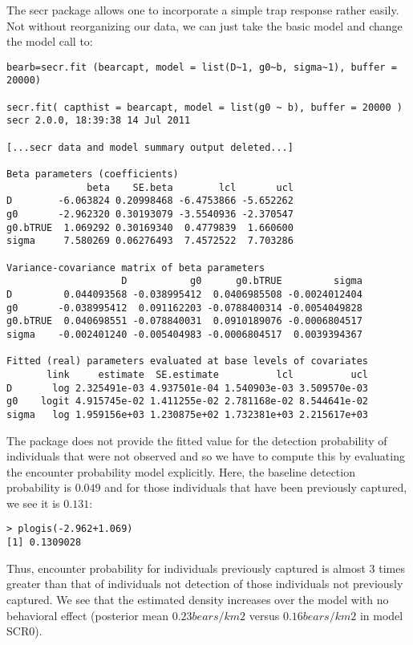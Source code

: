 The secr package allows one to incorporate a simple trap response
rather easily.  Not without reorganizing our data, we can just take
the basic model and change the model call to:
{\small
\begin{verbatim}
bearb=secr.fit (bearcapt, model = list(D~1, g0~b, sigma~1), buffer = 20000)

secr.fit( capthist = bearcapt, model = list(g0 ~ b), buffer = 20000 )
secr 2.0.0, 18:39:38 14 Jul 2011

[...secr data and model summary output deleted...]

Beta parameters (coefficients) 
              beta    SE.beta        lcl       ucl
D        -6.063824 0.20998468 -6.4753866 -5.652262
g0       -2.962320 0.30193079 -3.5540936 -2.370547
g0.bTRUE  1.069292 0.30169340  0.4779839  1.660600
sigma     7.580269 0.06276493  7.4572522  7.703286

Variance-covariance matrix of beta parameters 
                    D           g0      g0.bTRUE         sigma
D         0.044093568 -0.038995412  0.0406985508 -0.0024012404
g0       -0.038995412  0.091162203 -0.0788400314 -0.0054049828
g0.bTRUE  0.040698551 -0.078840031  0.0910189076 -0.0006804517
sigma    -0.002401240 -0.005404983 -0.0006804517  0.0039394367

Fitted (real) parameters evaluated at base levels of covariates 
       link     estimate  SE.estimate          lcl          ucl
D       log 2.325491e-03 4.937501e-04 1.540903e-03 3.509570e-03
g0    logit 4.915745e-02 1.411255e-02 2.781168e-02 8.544641e-02
sigma   log 1.959156e+03 1.230875e+02 1.732381e+03 2.215617e+03
\end{verbatim}
} 
The package \secr does not provide the fitted value for the detection
probability of individuals that were not observed and so we have to
compute this by evaluating the encounter probability model explicitly.
Here, the baseline
detection probability is $0.049$ and for those individuals that have
been previously captured, we see it is $0.131$:
\begin{verbatim}
> plogis(-2.962+1.069)
[1] 0.1309028
\end{verbatim}
Thus, encounter probability for individuals previously captured is
almost 3 times greater than that of individuals not 
 detection of those individuals
not previously captured.  We see that the 
estimated density increases over the model with no behavioral effect
(posterior mean $0.23
bears/km2$ versus $0.16 bears/km2$ in model SCR0).



